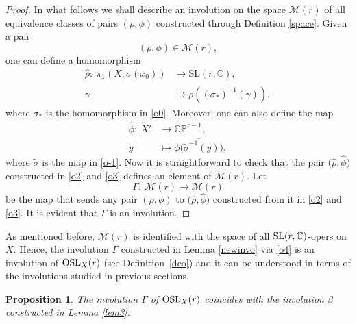 \documentclass[10pt,a4paper]{amsart}
\numberwithin{equation}{section}
\newtheorem{Proposition}[Theorem]{Proposition}
 { \theoremstyle{definition}
\newtheorem{Definition}[Theorem]{Definition}
\newtheorem{Note}[Theorem]{Note}
\newtheorem{Example}[Theorem]{Example}
\newtheorem{Remark}[Theorem]{Remark} }
\begin{document}
\begin{proof}
In what follows we shall describe an involution on the space ${\mathcal M}(r)$ of all equivalence
classes of pairs $(\rho, \phi)$ constructed through Definition \ref{space}.
Given a pair
\[%
(\rho, \phi) \in {\mathcal M}(r),
\]
one can define a homomorphism
\begin{align}
\widehat{\rho}\colon\ \pi_1(X, \sigma(x_0)) &\longrightarrow \text{SL}(r, {\mathbb C}),\nonumber\\
\gamma &\mapsto \overline{\rho((\sigma_*)^{-1}(\gamma))},\label{o2}
\end{align}
where $\sigma_*$ is the homomorphism in
\eqref{o0}.
Moreover, one can also define the map
\begin{align}
\widehat{\phi}\colon\ \widetilde{X}' &\longrightarrow {\mathbb C}{\mathbb P}^{r-1},\nonumber\\
y&\mapsto\overline{\phi\bigl(\widetilde{\sigma}^{-1}(y)\bigr)}, \label{o3}
\end{align}
where $\widetilde{\sigma}$ is the map in \eqref{o-1}. Now it is straightforward to
check that the pair $\bigl(\widehat{\rho}, \widehat{\phi}\bigr)$ constructed in \eqref{o2}
and \eqref{o3} defines an element of ${\mathcal M}(r)$. Let
\begin{equation}\label{o4}
\Gamma\colon\ {\mathcal M}(r) \longrightarrow {\mathcal M}(r)
\end{equation}
be the map that sends any pair $(\rho, \phi)$ to $\bigl(\widehat{\rho}, \widehat{\phi}\bigr)$
constructed from it in \eqref{o2} and \eqref{o3}. It is evident that $\Gamma$ is an involution.\end{proof}

As mentioned before,
${\mathcal M}(r)$ is identified with the space of all
${\rm SL}(r, {\mathbb C})$-opers on $X$. Hence, the involution $\Gamma$ constructed in Lemma \ref{newinvo} via \eqref{o4}
is an involution of ${\rm OSL}_X(r)$ (see Definition~\ref{deo}) and it can be understood in terms of the involutions studied in previous sections.

\begin{Proposition}\label{prop3}
The involution $\Gamma$ of ${\rm OSL}_X(r)$ coincides with the involution
$\beta$ constructed in Lemma {\rm \ref{lem3}}.
\end{Proposition}
\end{document}

